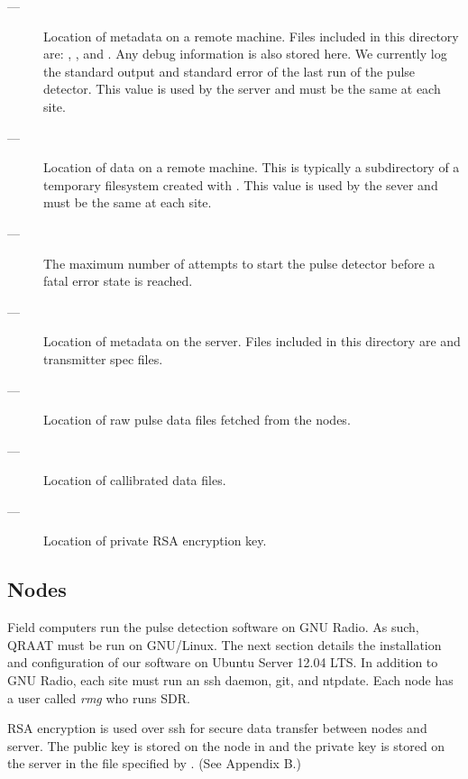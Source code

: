 \documentclass[letter]{article}
\begin{document}
\begin{description}
  \item[\quad {} ---] Location of metadata on a remote 
   machine. Files included in this directory are: , , 
   and . Any debug information is also stored here. We currently 
   log the standard output and standard error of the last run of the pulse detector. 
   This value is used by the server and must be the same at each site. 

  \item[\quad {} ---] Location of data on a remote machine. 
   This is typically a subdirectory of a temporary filesystem created with 
   . This value is used by the sever and must be the same at 
   each site. 
  
  \item[\quad {} ---] The maximum number of attempts to start the 
   pulse detector before a fatal error state is reached. 
   
  \item[\quad {} ---] Location of metadata on the 
   server. Files included in this directory are  and transmitter
   spec files.

  \item[\quad {} ---] Location of raw pulse data files 
   fetched from the nodes.
  
  \item[\quad {} ---] Location of callibrated data files. 
  
  \item[\quad {} ---] Location of private RSA encryption
   key. 
  
\end{description}

\subsection{Nodes}
Field computers run the pulse detection software on GNU Radio. As such, QRAAT must be
run on GNU/Linux. The next section details the installation and configuration of our
software on Ubuntu Server 12.04 LTS. In addition to GNU Radio, each site must run 
an ssh daemon, git, and ntpdate. Each node has a user called \textit{rmg} who runs SDR. 

RSA encryption is used over ssh for secure data transfer between nodes and server. The 
public key is stored on the node in  and the private key
is stored on the server in the file specified by . (See Appendix B.)
\end{document}
